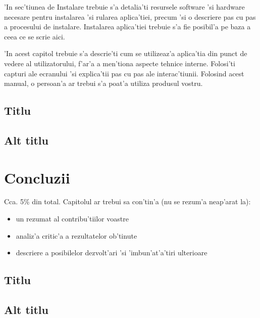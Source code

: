 \documentclass[12pt,a4paper,twoside]{report}
\begin{document}
'In sec'tiunea de Instalare trebuie s'a detalia'ti resursele software 'si hardware necesare pentru instalarea 'si rularea aplica'tiei, precum 'si o descriere pas cu pas a procesului de instalare. 
Instalarea aplica'tiei trebuie s'a fie posibil'a pe baza a ceea ce se scrie aici.

'In acest capitol trebuie s'a descrie'ti cum se utilizeaz'a aplica'tia din punct de vedere al utilizatorului, f'ar'a a men'tiona aspecte tehnice interne.
Folosi'ti capturi ale ecranului 'si explica'tii pas cu pas ale interac'tiunii. 
Folosind acest manual, o persoan'a ar trebui s'a poat'a utiliza produsul vostru.

\section{Titlu}
\section{Alt titlu}

\chapter{Concluzii}

Cca. 5\% din total.
Capitolul ar trebui sa con'tin'a (nu se rezum'a neap'arat la):
\begin{itemize}
 \item un rezumat al contribu'tiilor voastre
\item analiz'a critic'a a rezultatelor ob'tinute
\item descriere a posibilelor dezvolt'ari 'si 'imbun'at'a'tiri ulterioare
\end{itemize}


\section{Titlu}
\section{Alt titlu}


 


\end{document}
